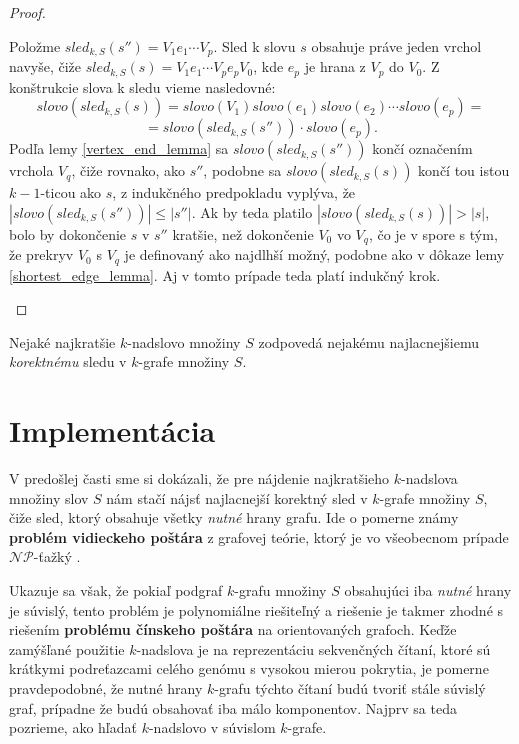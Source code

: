 \begin{proof}
\begin{itemize}
                      Položme $sled_{k,S}(s'') = V_1 e_1 \cdots V_p$. Sled k slovu $s$ obsahuje práve jeden vrchol navyše, čiže $sled_{k,S}(s) = V_1 e_1 \cdots V_p e_p V_0$,
                      kde $e_p$ je hrana z $V_p$ do $V_0$. Z konštrukcie slova k sledu vieme nasledovné: \\
                      $$slovo(sled_{k,S}(s)) = slovo(V_1) slovo(e_1) slovo(e_2) \cdots slovo(e_p) = $$
                      $$ = slovo(sled_{k,S}(s'')) \cdot slovo(e_p).$$
                        Podľa lemy \ref{vertex_end_lemma} sa $slovo(sled_{k,S}(s''))$ končí označením vrchola $V_q$, čiže rovnako, ako $s''$,
                      podobne sa $slovo(sled_{k,S}(s))$ končí tou istou $k-1$-ticou ako $s$, z indukčného predpokladu vyplýva, že $|slovo(sled_{k,S}(s''))| \leq |s''|$.
                      Ak by teda platilo $|slovo(sled_{k,S}(s))| > |s|$, bolo by dokončenie $s$ v $s''$ kratšie, než dokončenie $V_0$ vo $V_q$,
                      čo je v spore s tým, že prekryv $V_0$ s $V_q$ je definovaný ako najdlhší možný, podobne ako v dôkaze lemy \ref{shortest_edge_lemma}.
                      Aj v tomto prípade teda platí indukčný krok. \qedhere
            \end{itemize}
    
\end{proof}

\begin{dosl}
    Nejaké najkratšie $k$-nadslovo množiny $S$ zodpovedá nejakému najlacnejšiemu \emph{korektnému} sledu v $k$-grafe množiny $S$.
\end{dosl}

\section{Implementácia}

V predošlej časti sme si dokázali, že pre nájdenie najkratšieho $k$-nadslova množiny slov $S$
nám stačí nájsť najlacnejší korektný sled v $k$-grafe množiny $S$, čiže sled, ktorý obsahuje
všetky \emph{nutné} hrany grafu. Ide o pomerne známy \textbf{problém vidieckeho poštára} z grafovej teórie,
ktorý je vo všeobecnom prípade $\mathcal{NP}$-ťažký \cite{ruralpostman}.

Ukazuje sa však, že pokiaľ podgraf $k$-grafu množiny $S$ obsahujúci iba \emph{nutné} hrany je súvislý,
tento problém je polynomiálne riešiteľný a riešenie je takmer zhodné s riešením \textbf{problému čínskeho
poštára} na orientovaných grafoch. Keďže zamýšľané použitie $k$-nadslova je na reprezentáciu sekvenčných čítaní, ktoré sú
krátkymi podreťazcami celého genómu s vysokou mierou pokrytia, je pomerne pravdepodobné, že nutné hrany
$k$-grafu týchto čítaní budú tvoriť stále súvislý graf, prípadne že budú obsahovať iba málo komponentov.
Najprv sa teda pozrieme, ako hľadať $k$-nadslovo v súvislom $k$-grafe.

